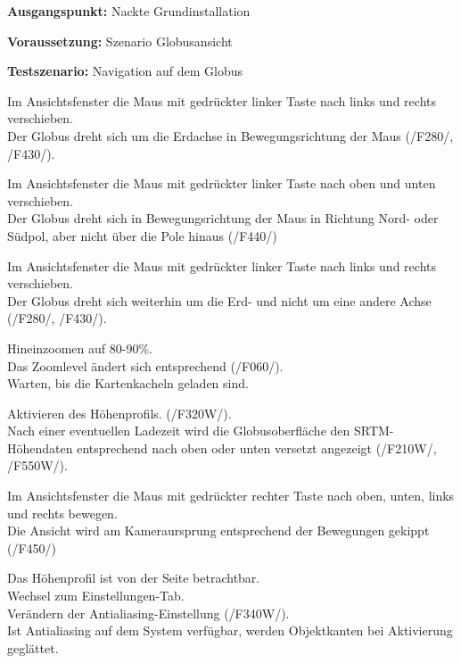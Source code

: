 \documentclass[10pt]{scrreprt}
\newcommand{\sfbf}[1]{\textbf{\sffamily #1}}
\newcommand{\ziel}[1]{{\fontsize{9.5}{11}\textsf{/#1/}}}
\newcommand{\ziellabel}{Z}
\newcommand{\muss}{\renewcommand{\labelenumi}{\textbf{\ziel{\ziellabel\numprint{\theenumi}0}}}}
\newcommand{\wunsch}{\renewcommand{\labelenumi}{\textbf{\ziel{\ziellabel\numprint{\theenumi}0W}}}}
\newenvironment{details}[1][6pt]{%
  \parskip#1 \parindent6mm \raggedright%
  \def\item{\par\ignorespaces\hangindent=5mm \hangafter1}}{%
  \par\ignorespaces}
\begin{document}
\vspace{1.0cm}
\begin{details}[2pt]
\item \sfbf{Ausgangspunkt:} Nackte Grundinstallation 
\item \sfbf{Voraussetzung:} Szenario Globusansicht
\item \sfbf{Testszenario:} Navigation auf dem Globus
\end{details}
\vspace{2mm}
\begin{enumerate}[leftmargin = 2.2cm, resume]
\item Im Ansichtsfenster die Maus mit gedrückter linker Taste nach links und rechts verschieben.\\Der Globus dreht sich um die Erdachse in Bewegungsrichtung der Maus (\ziel{F280}, \ziel{F430}).
\item Im Ansichtsfenster die Maus mit gedrückter linker Taste nach oben und unten verschieben.\\Der Globus dreht sich in Bewegungsrichtung der Maus in Richtung Nord- oder Südpol, aber nicht über die Pole hinaus (\ziel{F440})
\item Im Ansichtsfenster die Maus mit gedrückter linker Taste nach links und rechts verschieben.\\Der Globus dreht sich weiterhin um die Erd- und nicht um eine andere Achse (\ziel{F280}, \ziel{F430}).
\item Hineinzoomen auf 80-90\%.\\ Das Zoomlevel ändert sich entsprechend (\ziel{F060}).\\ Warten, bis die Kartenkacheln geladen sind.
\wunsch
\item Aktivieren des Höhenprofils. (\ziel{F320W}).\\ Nach einer eventuellen Ladezeit wird die Globusoberfläche den SRTM-Höhendaten entsprechend nach oben oder unten versetzt angezeigt (\ziel{F210W}, \ziel{F550W}).
\muss
\item Im Ansichtsfenster die Maus mit gedrückter rechter Taste nach oben, unten, links und rechts bewegen.\\Die Ansicht wird am Kameraursprung entsprechend der Bewegungen gekippt (\ziel{F450})
\wunsch
\item Das Höhenprofil ist von der Seite betrachtbar.\\Wechsel zum Einstellungen-Tab.\\Verändern der Antialiasing-Einstellung (\ziel{F340W}).\\Ist Antialiasing auf dem System verfügbar, werden Objektkanten bei Aktivierung geglättet.

\end{enumerate}
\end{document}
